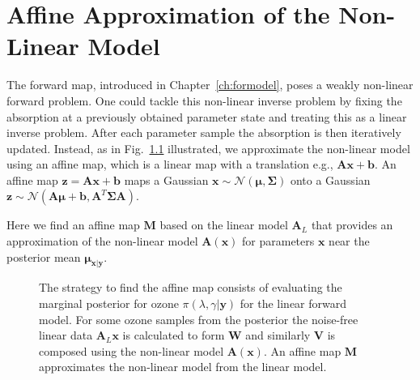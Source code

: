 \chapter{Affine Approximation of the Non-Linear Model}
\label{ch:affine}
\thispagestyle{empty}
\newcommand*{\vertbar}{\rule[-1ex]{0.5pt}{2.5ex}}
\newcommand*{\horzbar}{\rule[.5ex]{2.5ex}{0.5pt}}
The forward map, introduced in Chapter~\ref{ch:formodel}, poses a weakly non-linear forward problem.
One could tackle this non-linear inverse problem by fixing the absorption at a previously obtained parameter state and treating this as a linear inverse problem.
After each parameter sample the absorption is then iteratively updated.
Instead, as in Fig.~\ref{fig:affinStrat} illustrated, we approximate the non-linear model using an affine map, which is a linear map with a translation e.g., $\bm{A}\bm{x} + \bm{b}$.
An affine map $ \bm{z} = \bm{A}\bm{x} + \bm{b}$ maps a Gaussian $\bm{x} \sim \mathcal{N}(\bm{\mu}, \bm{\Sigma})$ onto a Gaussian $\bm{z} \sim \mathcal{N}(\bm{A}\bm{\mu} + \bm{b}, \bm{A}^T\bm{\Sigma}\bm{A})$.

Here we find an affine map $\bm{M}$ based on the linear model $\bm{A}_L$ that provides an approximation of the non-linear model $\bm{A}(\bm{x})$ for parameters $\bm{x}$ near the posterior mean $\bm{\mu}_{\bm{x}|\bm{y}}$.
\begin{figure}[htb!]
	\centering
	\caption[Strategy to find affine map.]{The strategy to find the affine map consists of evaluating the marginal posterior for ozone $\pi(\lambda , \gamma  | \bm{y})$ for the linear forward model. For some ozone samples from the posterior the noise-free linear data $\bm{A}_L \bm{x}$ is calculated to form $\bm{W}$ and similarly $\bm{V}$ is composed using the non-linear model $\bm{A}(\bm{x})$. An affine map $\bm{M}$ approximates the non-linear model from the linear model.}
	\label{fig:affinStrat}
\end{figure}

